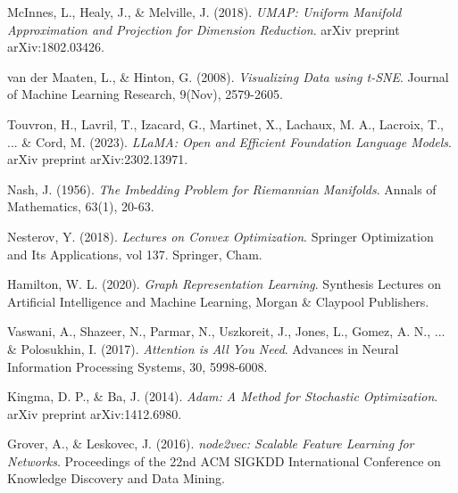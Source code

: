 \documentclass{article}
\begin{document}
\begin{thebibliography}{99}
McInnes, L., Healy, J., \& Melville, J. (2018).
\textit{UMAP: Uniform Manifold Approximation and Projection for Dimension Reduction}.
arXiv preprint arXiv:1802.03426.

van der Maaten, L., \& Hinton, G. (2008).
\textit{Visualizing Data using t-SNE}.
Journal of Machine Learning Research, 9(Nov), 2579-2605.

Touvron, H., Lavril, T., Izacard, G., Martinet, X., Lachaux, M. A., Lacroix, T., ... \& Cord, M. (2023).
\textit{LLaMA: Open and Efficient Foundation Language Models}.
arXiv preprint arXiv:2302.13971.

Nash, J. (1956).
\textit{The Imbedding Problem for Riemannian Manifolds}.
Annals of Mathematics, 63(1), 20-63.

Nesterov, Y. (2018).
\textit{Lectures on Convex Optimization}.
Springer Optimization and Its Applications, vol 137. Springer, Cham.

Hamilton, W. L. (2020).
\textit{Graph Representation Learning}.
Synthesis Lectures on Artificial Intelligence and Machine Learning, Morgan \& Claypool Publishers.

Vaswani, A., Shazeer, N., Parmar, N., Uszkoreit, J., Jones, L., Gomez, A. N., ... \& Polosukhin, I. (2017).
\textit{Attention is All You Need}.
Advances in Neural Information Processing Systems, 30, 5998-6008.

Kingma, D. P., \& Ba, J. (2014).
\textit{Adam: A Method for Stochastic Optimization}.
arXiv preprint arXiv:1412.6980.

Grover, A., \& Leskovec, J. (2016).
\textit{node2vec: Scalable Feature Learning for Networks}.
Proceedings of the 22nd ACM SIGKDD International Conference on Knowledge Discovery and Data Mining.

\end{thebibliography}
\end{document}
